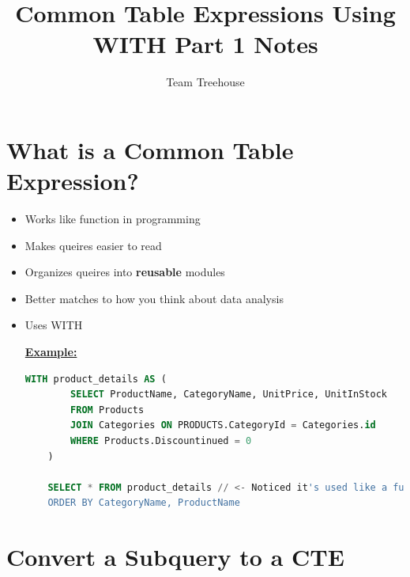\documentclass[12pt]{article}
\begin{document}
\title{Common Table Expressions Using WITH Part 1 Notes}
\author{Team Treehouse}
\maketitle

\bigskip

\section{What is a Common Table Expression?}

\bigskip

\begin{itemize}
    \item Works like function in programming
    \item Makes queires easier to read
    \item Organizes queires into \textbf{reusable} modules
    \item Better matches to how you think about data analysis
    \item Uses WITH

    \bigskip

    \underline{\textbf{Example:}}

    \bigskip

    \begin{lstlisting}[language=SQL]
    WITH product_details AS (
        SELECT ProductName, CategoryName, UnitPrice, UnitInStock
        FROM Products
        JOIN Categories ON PRODUCTS.CategoryId = Categories.id
        WHERE Products.Discountinued = 0
    )

    SELECT * FROM product_details // <- Noticed it's used like a function
    ORDER BY CategoryName, ProductName
    \end{lstlisting}
\end{itemize}

\bigskip

\section{Convert a Subquery to a CTE}

\bigskip
\end{document}
